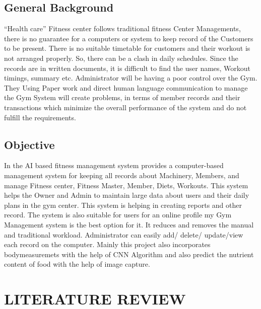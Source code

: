 \documentclass[a4paper,12pt,toc=flat]{report}
\begin{document}
	\section{General Background}
	
	
	
	\hspace*{12pt}“Health care” Fitness center follows traditional fitness Center Managements, there is no guarantee for a computers or system to keep record of the Customers to be present. There is no suitable timetable for customers  and their workout is not arranged properly. So, there can be a clash in daily schedules. Since the records are in written documents, it is difficult to find the user names, Workout timings, summary etc. Administrator will be having a poor control over the Gym. They Using Paper work and direct human language communication to manage the Gym System will create problems, in terms of member records and their transactions which minimize the overall performance of the system and do not fulfill the requirements.  \\
	
	\pagebreak
	
	\section{Objective}
	\hspace*{12pt}In the AI based fitness management system provides a computer-based management system for keeping all records about Machinery, Members, and manage Fitness center, Fitness Master, Member, Diets, Workouts. This system helps the Owner and Admin to maintain large data about users and their daily plans in the gym center. This system is helping in creating reports and other record. The system is also suitable for users for an online profile my Gym Management system is the best option for it. It reduces and removes the manual and traditional workload. Administrator can easily add/ delete/ update/view each record on the computer. Mainly this project also incorporates bodymeasuremets with the help of CNN Algorithm and also predict the nutrient content of food with the help of image capture.  
	
	
	
	\hspace*{12pt}
	\pagebreak
		\chapter{LITERATURE REVIEW}
	
\end{document}
